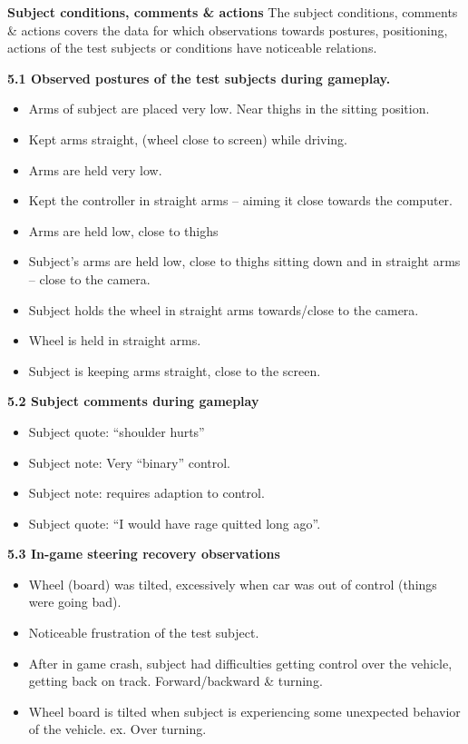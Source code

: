 \noindent\colorbox{NotRed}{\textbf{Subject conditions, comments \& actions}}\newline
The subject conditions, comments \& actions covers the data for which observations towards postures, positioning, actions of the test subjects or conditions have noticeable relations. 

\noindent\textbf{5.1 Observed postures of the test subjects during gameplay.}
\begin{itemize}
\item Arms of subject are placed very low. Near thighs in the sitting position.
\item Kept arms straight, (wheel close to screen) while driving.
\item Arms are held very low.
\item Kept the controller in straight arms – aiming it close towards the computer.
\item Arms are held low, close to thighs
\item Subject’s arms are held low, close to thighs sitting down and in straight arms – close to the camera.
\item Subject holds the wheel in straight arms towards/close to the camera.
\item Wheel is held in straight arms.
\item Subject is keeping arms straight, close to the screen.

\end{itemize}


\noindent\textbf{5.2 Subject comments during gameplay}
\begin{itemize}
\item Subject quote: “shoulder hurts”
\item Subject note: Very “binary” control.
\item Subject note: requires adaption to control.
\item Subject quote: “I would have rage quitted long ago”.

\end{itemize}


\noindent\textbf{5.3 In-game steering recovery observations}
\begin{itemize}
\item Wheel (board) was tilted, excessively when car was out of control (things were going bad).
\item Noticeable frustration of the test subject.
\item After in game crash, subject had difficulties getting control over the vehicle, getting back on track. Forward/backward \& turning.
\item Wheel board is tilted when subject is experiencing some unexpected behavior of the vehicle. ex. Over turning.

\end{itemize}


